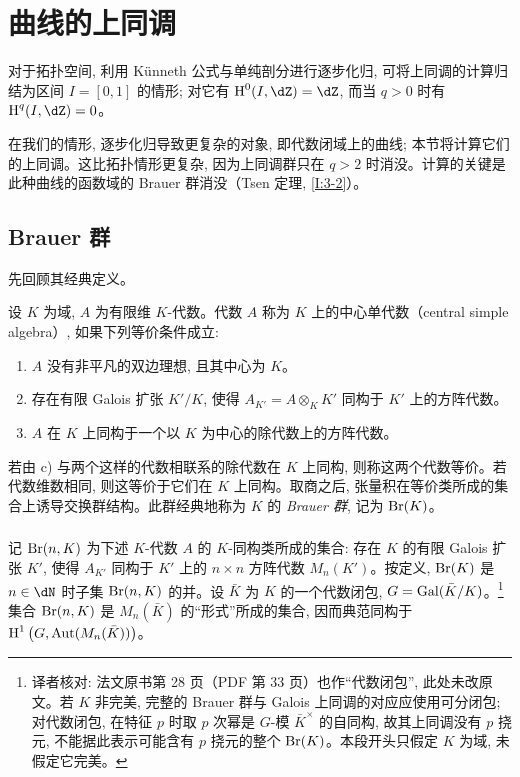 \section{曲线的上同调}\label{I:3}

对于拓扑空间, 利用 K\"unneth 公式与单纯剖分进行逐步化归, 可将上同调的计算归结为区间 $I=[0,1]$ 的情形; 对它有 $\h^0(I,\dZ)=\dZ$, 而当 $q>0$ 时有 $\h^q(I,\dZ)=0$。

在我们的情形, 逐步化归导致更复杂的对象, 即代数闭域上的曲线; 本节将计算它们的上同调。这比拓扑情形更复杂, 因为上同调群只在 $q>2$ 时消没。计算的关键是此种曲线的函数域的 Brauer 群消没（Tsen 定理, \ref{I:3-2}）。

\subsection{Brauer 群}\label{I:3-1}

先回顾其经典定义。

\begin{definition}\label{I:3-1-1}
设 $K$ 为域, $A$ 为有限维 $K$-代数。代数 $A$ 称为 $K$ 上的中心单代数（central simple algebra）, 如果下列等价条件成立:
\begin{enumerate}[\indent a)]
  \item $A$ 没有非平凡的双边理想, 且其中心为 $K$。
  \item 存在有限 Galois 扩张 $K'/K$, 使得 $A_{K'}=A\otimes_KK'$ 同构于 $K'$ 上的方阵代数。
  \item $A$ 在 $K$ 上同构于一个以 $K$ 为中心的除代数上的方阵代数。
\end{enumerate}
\end{definition}

若由 c) 与两个这样的代数相联系的除代数在 $K$ 上同构, 则称这两个代数等价。若代数维数相同, 则这等价于它们在 $K$ 上同构。取商之后, 张量积在等价类所成的集合上诱导交换群结构。此群经典地称为 $K$ 的 \emph{Brauer 群}, 记为 $\operatorname{Br}(K)$。

\subsubsection{}\label{I:3-1-2}

记 $\operatorname{Br}(n,K)$ 为下述 $K$-代数 $A$ 的 $K$-同构类所成的集合: 存在 $K$ 的有限 Galois 扩张 $K'$, 使得 $A_{K'}$ 同构于 $K'$ 上的 $n\times n$ 方阵代数 $M_n(K')$。按定义, $\operatorname{Br}(K)$ 是 $n\in\dN$ 时子集 $\operatorname{Br}(n,K)$ 的并。设 $\bar K$ 为 $K$ 的一个代数闭包, $G=\operatorname{Gal}(\bar K/K)$。\footnote{译者核对: 法文原书第 28 页（PDF 第 33 页）也作“代数闭包”, 此处未改原文。若 $K$ 非完美, 完整的 Brauer 群与 Galois 上同调的对应应使用可分闭包; 对代数闭包, 在特征 $p$ 时取 $p$ 次幂是 $G$-模 $\bar K^\times$ 的自同构, 故其上同调没有 $p$ 挠元, 不能据此表示可能含有 $p$ 挠元的整个 $\operatorname{Br}(K)$。本段开头只假定 $K$ 为域, 未假定它完美。}集合 $\operatorname{Br}(n,K)$ 是 $M_n(\bar K)$ 的“形式”所成的集合, 因而典范同构于 $\operatorname{H}^1\left(G,\operatorname{Aut}(M_n(\bar K))\right)$。

